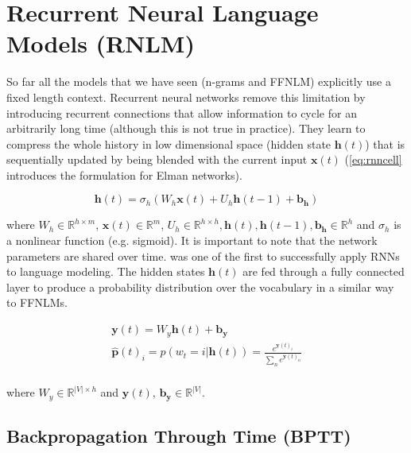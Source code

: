 \section{Recurrent Neural Language Models (RNLM)}
\label{sec:rnn}

So far all the models that we have seen (n-grams and FFNLM) explicitly use a fixed length context. Recurrent neural networks remove this limitation by introducing recurrent connections that allow information to cycle for an arbitrarily long time (although this is not true in practice). They learn to compress the whole history in low dimensional space (hidden state $\mathbf{h}(t)$) that is sequentially updated by being blended with the current input $\mathbf{x}(t)$ (\autoref{eq:rnncell} introduces the formulation for Elman networks).

\begin{equation} \label{eq:rnncell}
		\mathbf{h}(t) = \sigma_h(W_h \mathbf{x}(t) + U_h \mathbf{h}(t-1) + \mathbf{b_h})
\end{equation}

where $W_h \in \mathbb{R}^{h \times m}$, $\mathbf{x}(t) \in \mathbb{R}^{m}$, $U_h \in \mathbb{R}^{h \times h} , \mathbf{h}(t), \mathbf{h}(t-1), \mathbf{b_h} \in \mathbb{R}^{h}$ and $\sigma_h$ is a nonlinear function (e.g. sigmoid). It is important to note that the network parameters are shared over time. \cite{mikolov2010recurrent} was one of the first to successfully apply RNNs to language modeling. The hidden states $\mathbf{h}(t)$ are fed through a fully connected layer to produce a probability distribution over the vocabulary in a similar way to FFNLMs.

\begin{equation} \label{eq:rnnlm}
	\begin{gathered}
		\mathbf{y}(t) = W_y \mathbf{h}(t) + \mathbf{b_y} \\
		\mathbf{\hat{p}}(t)_i=\hat{p}(w_t=i|\mathbf{h}(t)) = \frac{e^{\mathbf{y}(t)_i}}{\sum_{n}e^{\mathbf{y}(t)_n}} \\
	\end{gathered}
\end{equation}

where $W_y \in \mathbb{R}^{|V| \times h}$ and $\mathbf{y}(t)$, $\mathbf{b_y} \in \mathbb{R}^{|V|}$.

\subsection{Backpropagation Through Time (BPTT)}

